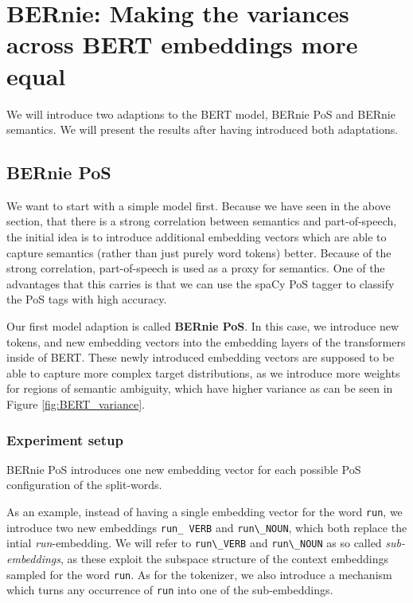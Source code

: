 \documentclass[a4paper,12pt,twoside,openright]{report}
\begin{document}
\section{BERnie: Making the variances across BERT embeddings more equal}

We will introduce two adaptions to the BERT model, BERnie PoS and BERnie semantics.
We will present the results after having introduced both adaptations.

\subsection{BERnie PoS} \label{bernie_pos}

We want to start with a simple model first.
Because we have seen in the above section, that there is a strong correlation between semantics and part-of-speech, the initial idea is to introduce additional embedding vectors which are able to capture semantics (rather than just purely word tokens) better.
Because of the strong correlation, part-of-speech is used as a proxy for semantics.
One of the advantages that this carries is that we can use the spaCy PoS tagger \cite{spacyb} to classify the PoS tags with high accuracy.

Our first model adaption is called \textbf{BERnie PoS}.
In this case, we introduce new tokens, and new embedding vectors into the embedding layers of the transformers inside of BERT.
These newly introduced embedding vectors are supposed to  be able to capture more complex target distributions, as we introduce more weights for regions of semantic ambiguity, which have higher variance as can be seen in Figure \eqref{fig:BERT_variance}.

\subsubsection{Experiment setup}

BERnie PoS introduces one new embedding vector for each possible PoS configuration of the split-words.

As an example, instead of having a single embedding vector for the word \Verb#run#, we introduce two new embeddings \Verb#run_ VERB# and \Verb#run\_NOUN#, which both replace the intial \textit{run}-embedding. 
We will refer to \Verb#run\_VERB# and \Verb#run\_NOUN# as so called \textit{sub-embeddings}, as these exploit the subspace structure of the context embeddings sampled for the word \Verb#run#.
As for the tokenizer, we also introduce a mechanism which turns any occurrence of \Verb#run# into one of the sub-embeddings.
\end{document}
